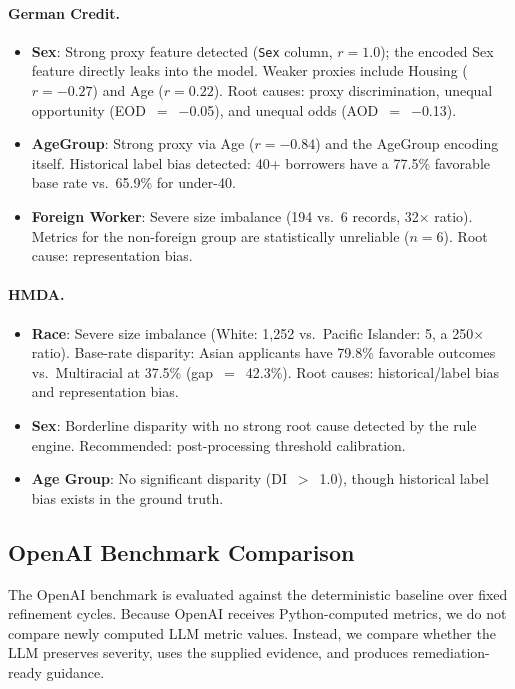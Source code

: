 \documentclass[11pt,a4paper]{article}
\begin{document}
\paragraph{German Credit.}
\begin{itemize}[nosep]
  \item \textbf{Sex}: Strong proxy feature detected (\texttt{Sex} column,
        $r{=}1.0$); the encoded Sex feature directly leaks into the model.
        Weaker proxies include Housing ($r{=}{-}0.27$) and Age ($r{=}0.22$).
        Root causes: proxy discrimination, unequal opportunity
        (EOD~$=$~$-$0.05), and unequal odds (AOD~$=$~$-$0.13).
  \item \textbf{AgeGroup}: Strong proxy via Age ($r{=}{-}0.84$) and the
        AgeGroup encoding itself. Historical label bias detected: 40+
        borrowers have a 77.5\% favorable base rate vs.\ 65.9\% for under-40.
  \item \textbf{Foreign Worker}: Severe size imbalance (194 vs.\ 6 records,
        32$\times$ ratio). Metrics for the non-foreign group are statistically
        unreliable ($n{=}6$). Root cause: representation bias.
\end{itemize}

\paragraph{HMDA.}
\begin{itemize}[nosep]
  \item \textbf{Race}: Severe size imbalance (White: 1{,}252 vs.\ Pacific
        Islander: 5, a 250$\times$ ratio). Base-rate disparity: Asian
        applicants have 79.8\% favorable outcomes vs.\ Multiracial at 37.5\%
        (gap~$=$~42.3\%). Root causes: historical/label bias and
        representation bias.
  \item \textbf{Sex}: Borderline disparity with no strong root cause
        detected by the rule engine. Recommended: post-processing threshold
        calibration.
  \item \textbf{Age Group}: No significant disparity (DI~$>$~1.0), though
        historical label bias exists in the ground truth.
\end{itemize}

\subsection{OpenAI Benchmark Comparison}

The OpenAI benchmark is evaluated against the deterministic baseline over
fixed refinement cycles. Because OpenAI receives Python-computed metrics, we
do not compare newly computed LLM metric values. Instead, we compare whether
the LLM preserves severity, uses the supplied evidence, and produces
remediation-ready guidance.
\end{document}
